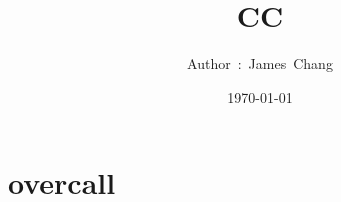 

\title{CC}
\author{ {\Biohazard} \hspace{1.5mm} \hspace{1.5mm} Author\ :\ James\ Chang}
\date{\today}


\large

\tableofcontents

\chapter{overcall}





